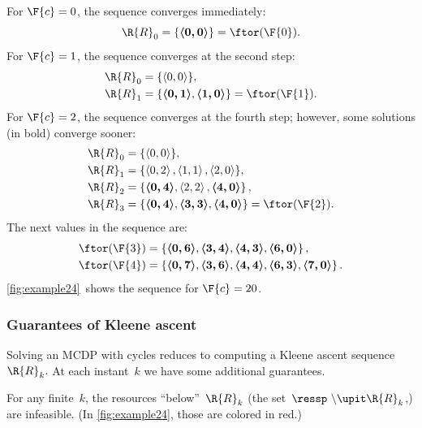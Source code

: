 \noindent For $\F{c}=0$, the sequence converges immediately: 
\[
\R{R}_{0}=\{\boldsymbol{\left\langle 0,0\right\rangle }\}=\ftor(\F{0}).
\]
 For $\F{c}=1$, the sequence converges at the second step:
\begin{align*}
\R{R}_{0} & =\{\left\langle 0,0\right\rangle \},\\
\R{R}_{1} & =\{\boldsymbol{\left\langle 0,1\right\rangle },\boldsymbol{\left\langle 1,0\right\rangle }\}=\ftor(\F{1}).
\end{align*}
For $\F{c}=2$, the sequence converges at the fourth step; however,
some solutions (in bold) converge sooner:
\begin{align*}
\R{R}_{0} & =\{\left\langle 0,0\right\rangle \},\\
\R{R}_{1} & =\{\left\langle 0,2\right\rangle ,\left\langle 1,1\right\rangle ,\left\langle 2,0\right\rangle \},\\
\R{R}_{2} & =\left\{ \boldsymbol{\left\langle 0,4\right\rangle },\left\langle 2,2\right\rangle ,\boldsymbol{\left\langle 4,0\right\rangle }\right\} ,\\
\R{R}_{3} & =\{\boldsymbol{\left\langle 0,4\right\rangle },\boldsymbol{\left\langle 3,3\right\rangle },\boldsymbol{\left\langle 4,0\right\rangle }\}=\ftor(\F{2}).
\end{align*}
The next values in the sequence are:
\begin{align*}
\ftor(\F{3}) & =\left\{ \boldsymbol{\left\langle 0,6\right\rangle },\boldsymbol{\left\langle 3,4\right\rangle },\boldsymbol{\left\langle 4,3\right\rangle },\boldsymbol{\left\langle 6,0\right\rangle }\right\} ,\\
\ftor(\F{4}) & =\left\{ \boldsymbol{\left\langle 0,7\right\rangle },\boldsymbol{\left\langle 3,6\right\rangle },\boldsymbol{\left\langle 4,4\right\rangle },\boldsymbol{\left\langle 6,3\right\rangle },\boldsymbol{\left\langle 7,0\right\rangle }\right\} .
\end{align*}
\cref{fig:example24}~shows the sequence for $\F{c}=20$.

\subsubsection{Guarantees of Kleene ascent}

\noindent Solving an MCDP with cycles reduces to computing a Kleene
ascent sequence~$\R{R}_{k}.$ At each instant~$k$ we have some
additional guarantees. 

For any finite~$k$, the resources ``below''~$\R{R}_{k}$ (the
set~$\ressp\ \backslash\upit\R{R}_{k}$,) are infeasible. (In \cref{fig:example24},
those are colored in red.) 


